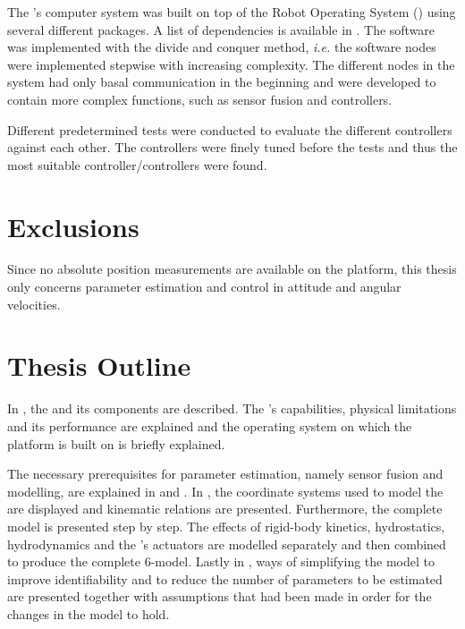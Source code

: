 The \abbrROV's computer system was built on top of the Robot Operating System (\abbrROS) using several different packages. A list of dependencies is available in . The software was implemented with the divide and conquer method, \textit{i.e.} the software nodes were implemented stepwise with increasing complexity. The different nodes in the system had only basal communication in the beginning and were developed to contain more complex functions, such as sensor fusion and controllers. 

Different predetermined tests were conducted to evaluate the different controllers against each other. The controllers were finely tuned before the tests and thus the most suitable controller/controllers were found.


\section{Exclusions}
Since no absolute position measurements are available on the \abbrROV platform, this thesis only concerns parameter estimation and control in attitude and angular velocities.%
\section{Thesis Outline}
In , the \abbrROV and its components are described. The \abbrROV's capabilities, physical limitations and its performance are explained and the operating system on which the \abbrROV platform is built on is briefly explained.

The necessary prerequisites for parameter estimation, namely sensor fusion and modelling, are explained in  and . In , the coordinate systems used to model the \abbrROV are displayed and kinematic relations are presented. Furthermore, the complete \abbrROV model is presented step by step. The effects of rigid-body kinetics, hydrostatics, hydrodynamics and the \abbrROV's actuators are modelled separately and then combined to produce the complete 6-\abbrDOF model. 
Lastly in , ways of simplifying the model to improve identifiability and to reduce the number of parameters to be estimated are presented together with assumptions that had been made in order for the changes in the model to hold. 

